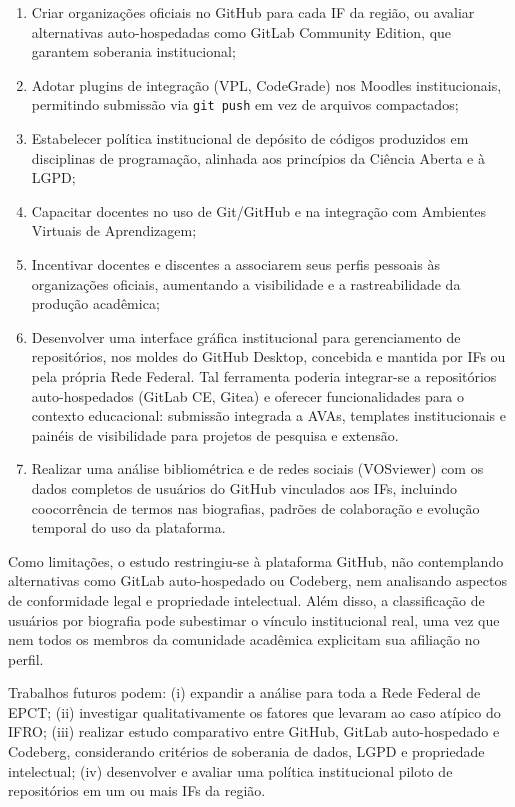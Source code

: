 \documentclass[english, spanish, brazilian]{RBIEarticle}
\begin{document}
\begin{enumerate}
    \item Criar organizações oficiais no GitHub para cada IF da região, ou avaliar alternativas auto-hospedadas como GitLab Community Edition, que garantem soberania institucional;
    \item Adotar plugins de integração (VPL, CodeGrade) nos Moodles institucionais, permitindo submissão via \texttt{git push} em vez de arquivos compactados;
    \item Estabelecer política institucional de depósito de códigos produzidos em disciplinas de programação, alinhada aos princípios da Ciência Aberta e à LGPD;
    \item Capacitar docentes no uso de Git/GitHub e na integração com Ambientes Virtuais de Aprendizagem;
    \item Incentivar docentes e discentes a associarem seus perfis pessoais às organizações oficiais, aumentando a visibilidade e a rastreabilidade da produção acadêmica;
    \item Desenvolver uma interface gráfica institucional para gerenciamento de repositórios, nos moldes do GitHub Desktop, concebida e mantida por IFs ou pela própria Rede Federal. Tal ferramenta poderia integrar-se a repositórios auto-hospedados (GitLab CE, Gitea) e oferecer funcionalidades para o contexto educacional: submissão integrada a AVAs, templates institucionais e painéis de visibilidade para projetos de pesquisa e extensão.
\item Realizar uma análise bibliométrica e de redes sociais (VOSviewer) com os dados completos de usuários do GitHub vinculados aos IFs, incluindo coocorrência de termos nas biografias, padrões de colaboração e evolução temporal do uso da plataforma.
\end{enumerate}


Como limitações, o estudo restringiu-se à plataforma GitHub, não contemplando alternativas como GitLab auto-hospedado ou Codeberg, nem analisando aspectos de conformidade legal e propriedade intelectual. Além disso, a classificação de usuários por biografia pode subestimar o vínculo institucional real, uma vez que nem todos os membros da comunidade acadêmica explicitam sua afiliação no perfil.

Trabalhos futuros podem: (i) expandir a análise para toda a Rede Federal de EPCT; (ii) investigar qualitativamente os fatores que levaram ao caso atípico do IFRO; (iii) realizar estudo comparativo entre GitHub, GitLab auto-hospedado e Codeberg, considerando critérios de soberania de dados, LGPD e propriedade intelectual; (iv) desenvolver e avaliar uma política institucional piloto de repositórios em um ou mais IFs da região.
\end{document}
